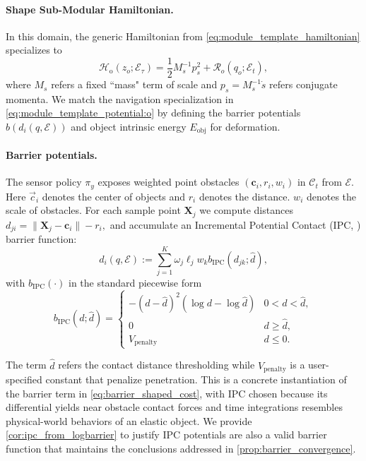 \paragraph{{Shape Sub-Modular Hamiltonian.}}

In this domain, the generic Hamiltonian from \cref{eq:module_template_hamiltonian} specializes to
\begin{equation}
\mathcal{H}_{\text{o}}(z_o;\mathcal{E}_\tau)
=\frac{1}{2}M_s^{-1} p_s^2 
+ \mathcal{R}_o(q_o;\mathcal{E}_t),
\end{equation}
where $M_s$ refers a fixed ``mass" term of scale and $p_s=M_s^{-1}\dot{s}$ refers conjugate momenta.
We match the navigation specialization in \cref{eq:module_template_potential:o} by defining the barrier potentials $b(d_i(q,\mathcal{E}))$ and object intrinsic energy $E_{\mathrm{obj}}$ for deformation.

\paragraph{{Barrier potentials.}}
The sensor policy $\pi_y$ exposes { weighted point obstacles} $(\mathbf{c}_i,r_i,w_i)$ in $\mathcal{C}_t$ from $\mathcal{E}$. Here $\vec{c}_i$ denotes the center of objects and $r_i$ denotes the distance. $w_i$ denotes the scale of obstacles. For each sample point $\mathbf{X}_j$ we compute distances \(d_{ji} = \|\mathbf{X}_j - \mathbf{c}_i\| - r_i,\)
and accumulate an Incremental Potential Contact (IPC, \citet{li2020incremental}) barrier function:
\begin{equation}
d_i(q,\mathcal{E}):=
\sum_{j=1}^K \omega_j \ell_j  w_k b_{\text{IPC}}(d_{jk};\hat{d}),
\end{equation}
with $b_{\text{IPC}}(\cdot)$ in the standard piecewise form
\begin{equation}
b_{\text{IPC}}(d;\hat{d}) =
\begin{cases}
-(d-\hat{d})^2(\log d - \log \hat{d}) & 0 < d < \hat{d},\\[2pt]
0 & d \geq \hat{d},\\[2pt]
V_{\text{penalty}} & d \leq 0.
\end{cases}
\end{equation}
 
The term $\hat{d}$ refers the contact distance thresholding while $V_{\text{penalty}}$ is a user-specified constant that penalize penetration. This is a concrete instantiation of the barrier term in \cref{eq:barrier_shaped_cost}, with IPC chosen because its differential yields near obstacle contact forces and time integrations resembles physical-world behaviors of an elastic object. { We provide \cref{cor:ipc_from_logbarrier} to justify IPC potentials are also a valid barrier function that maintains the conclusions addressed in \cref{prop:barrier_convergence}.}
